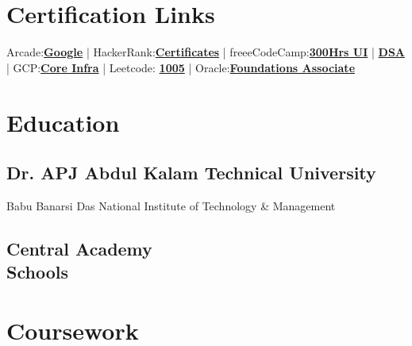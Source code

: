 \documentclass[]{hanisntsolo-resume}
\begin{document}
\begin{minipage}[t]{0.33\textwidth}
\sectionsep


\section{Certification Links} 
Arcade:\href{https://www.skills.google/public_profiles/61965ffb-13f9-4922-adda-60c5063e023a}{\bf Google} |
HackerRank:\href{https://www.hackerrank.com/certificates/b1b4d7e6ca54}{\bf Certificates} |
freeeCodeCamp:\href{https://www.freecodecamp.org/certification/hanisntsolo/responsive-web-design}{\bf 300Hrs UI} | \href{https://www.freecodecamp.org/certification/hanisntsolo/javascript-algorithms-and-data-structures}{\bf DSA} |
GCP:\href{https://www.coursera.org/account/accomplishments/certificate/QBS8P3XMLBX7}{\bf Core Infra} |
Leetcode: \href{https://leetcode.com/u/hanisntsolo/}{\bf 1005} |
Oracle:\href{https://catalog-education.oracle.com/ords/certview/sharebadge?id=EB6D11DF1609D5B12BD5424613644BCEA2BE9A9F801D25CD7DFA71237D22C6DC}{\bf Foundations Associate}
\sectionsep


\section{Education}

\subsection{Dr. APJ Abdul Kalam Technical University}
Babu Banarsi Das National Institute of Technology \& Management\\
\sectionsep

\subsection{Central Academy \\ Schools}
\sectionsep



\section{Coursework}

\end{minipage}
\end{document}
